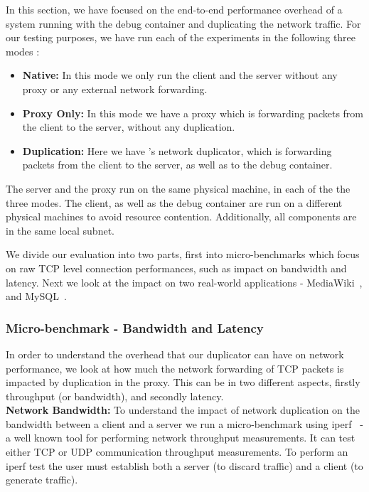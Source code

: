 In this section, we have focused on the end-to-end performance overhead of a system running with the debug container and duplicating the network traffic.
For our testing purposes, we have run each of the experiments in the following three modes : 

\begin{itemize}
	\item \textbf{Native:} In this mode we only run the client and the server without any proxy or any external network forwarding. 
	\item \textbf{Proxy Only:} In this mode we have a proxy which is  forwarding packets from the client to the server, without any duplication. 
	\item \textbf{Duplication:} Here we have \parikshan's network duplicator, which is forwarding packets from the client to the server, as well as to the debug container.
\end{itemize}

The server and the proxy run on the same physical machine, in each of the the three modes.
The client, as well as the debug container are run on a different physical machines to avoid resource contention.
Additionally, all components are in the same local subnet.

We divide our evaluation into two parts, first into micro-benchmarks which focus on raw TCP level connection performances, such as impact on bandwidth and latency. Next we look at the impact on two real-world applications - MediaWiki~\cite{mediawiki}, and MySQL~\cite{mysql}.

\subsubsection{Micro-benchmark - Bandwidth and Latency}
\label{sec:microBenchBandwidthLatency}

In order to understand the overhead that our duplicator can have on network performance, we look at how much the network forwarding of TCP packets is impacted by duplication in the proxy. 
This can be in two different aspects, firstly throughput (or bandwidth), and secondly latency.\\


\noindent\textbf{Network Bandwidth:}
To understand the impact of network duplication on the bandwidth between a client and a server we run a micro-benchmark using iperf~\cite{iperf} - a well known tool for performing network throughput measurements. It can test either TCP or UDP communication throughput measurements. 
To perform an iperf test  the  user must establish both a server (to discard traffic) and a client (to generate traffic).

